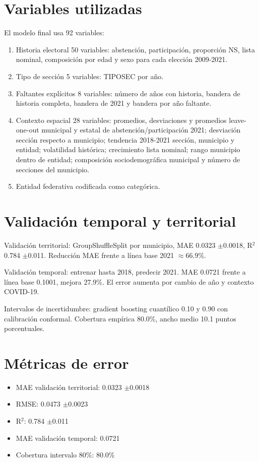 \documentclass[12pt,a4paper]{article}
\begin{document}
\section{Variables utilizadas}
El modelo final usa 92 variables:
\begin{enumerate}
\item Historia electoral 50 variables: abstención, participación, proporción NS, lista nominal, composición por edad y sexo para cada elección 2009-2021.
\item Tipo de sección 5 variables: TIPOSEC por año.
\item Faltantes explícitos 8 variables: número de años con historia, bandera de historia completa, bandera de 2021 y bandera por año faltante.
\item Contexto espacial 28 variables: promedios, desviaciones y promedios leave-one-out municipal y estatal de abstención/participación 2021; desviación sección respecto a municipio; tendencia 2018-2021 sección, municipio y entidad; volatilidad histórica; crecimiento lista nominal; rango municipio dentro de entidad; composición sociodemográfica municipal y número de secciones del municipio.
\item Entidad federativa codificada como categórica.
\end{enumerate}

\section{Validación temporal y territorial}
Validación territorial: GroupShuffleSplit por municipio, MAE 0.0323 $\pm$0.0018, R$^2$ 0.784 $\pm$0.011. Reducción MAE frente a línea base 2021 $\approx$66.9\%.

Validación temporal: entrenar hasta 2018, predecir 2021. MAE 0.0721 frente a línea base 0.1001, mejora 27.9\%. El error aumenta por cambio de año y contexto COVID-19.

Intervalos de incertidumbre: gradient boosting cuantílico 0.10 y 0.90 con calibración conformal. Cobertura empírica 80.0\%, ancho medio 10.1 puntos porcentuales.

\section{Métricas de error}
\begin{itemize}
\item MAE validación territorial: 0.0323 $\pm$0.0018
\item RMSE: 0.0473 $\pm$0.0023
\item R$^2$: 0.784 $\pm$0.011
\item MAE validación temporal: 0.0721
\item Cobertura intervalo 80\%: 80.0\%
\end{itemize}
\end{document}
